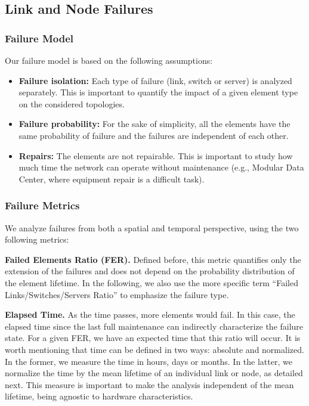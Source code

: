\subsection{Link and Node Failures}
\subsubsection{Failure Model}
\label{sec:failureModel}

Our failure model is based on the following assumptions:
\begin{itemize}
\item \textbf{Failure isolation:} Each type of failure (link, switch or server) is analyzed separately. This is important to quantify the impact of a given element type on the considered topologies.
\item \textbf{Failure probability:} For the sake of simplicity, all the elements have the same probability of failure and the failures are independent of each other.
\item \textbf{Repairs:} The elements are not repairable. This is important to study how much time the network can operate without maintenance (e.g., Modular Data Center, where equipment repair is a difficult task).
\end{itemize}
\subsubsection{Failure Metrics}
\label{sec:simulationOverview}

We analyze failures from both a spatial and temporal perspective, using the two following metrics:

\textbf{Failed Elements Ratio (FER).} Defined before, this metric quantifies only the extension of the failures and does not depend on the probability distribution of the element lifetime. In the following, we also use the more specific term ``Failed Links/Switches/Servers Ratio'' to emphasize the failure type. 

\textbf{Elapsed Time.} As the time passes, more elements would fail. In this case, the elapsed time since the last full maintenance can indirectly characterize the failure state.
For a given FER, we have an expected time that this ratio will occur. 
It is worth mentioning that time can be defined in two ways: absolute and normalized. In the former, we measure the time in hours, days or months. In the latter, we normalize the time by the mean lifetime of an individual link or node, as detailed next. This measure is important to make the analysis independent of the mean lifetime, being agnostic to hardware characteristics.

